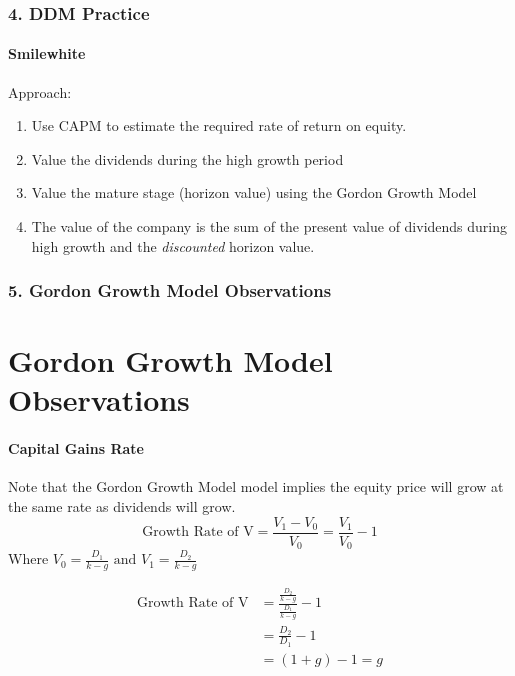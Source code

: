 \documentclass{beamer}
\begin{document}
\begin{practiceframe}[t]
    \frametitle{4. DDM Practice}
    \framesubtitle{Smilewhite}

      Approach:
      \begin{enumerate}
        \item Use CAPM to estimate the required rate of return on equity.
        \item Value the dividends during the high growth period
        \item Value the mature stage (horizon value) using the Gordon Growth Model
        \item The value of the company is the sum of the present value of dividends during high growth and the \textit{discounted} horizon value.
      \end{enumerate}


\end{practiceframe}



\begin{frame}[t]
    \frametitle{5. Gordon Growth Model Observations}
    \section{Gordon Growth Model Observations}
    \framesubtitle{Capital Gains Rate}

    Note that the Gordon Growth Model model implies the equity price will grow at the same rate as dividends will grow.
    $$
    \text{Growth Rate of V} = \frac{V_1-V_0}{V_0} =   \frac{V_1}{V_0} - 1
    $$
    Where $V_0 = \frac{D_1}{k-g} \text{ and } V_1 = \frac{D_2}{k-g}$

    \begin{align*}
    \text{Growth Rate of V} &= \frac{\frac{D_2}{k-g}}{\frac{D_1}{k-g}} - 1\\
    &= \frac{D_2}{D_1} - 1\\
    &= (1+g) - 1 = g
    \end{align*}

\end{frame}
\end{document}
